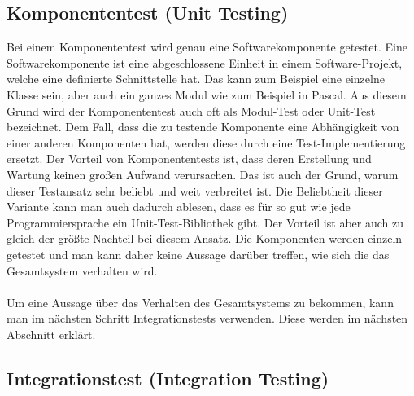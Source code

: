 \subsection{Komponententest (Unit Testing)}

Bei einem Komponententest wird genau eine Softwarekomponente getestet. Eine Softwarekomponente ist eine abgeschlossene Einheit in einem Software-Projekt, welche eine definierte Schnittstelle hat. Das kann zum Beispiel eine einzelne Klasse sein, aber auch ein ganzes Modul wie zum Beispiel in Pascal. Aus diesem Grund wird der Komponententest auch oft als Modul-Test oder Unit-Test bezeichnet. Dem Fall, dass die zu testende Komponente eine Abhängigkeit von einer anderen Komponenten hat, werden diese durch eine Test-Implementierung ersetzt. Der Vorteil von Komponententests ist, dass deren Erstellung und Wartung keinen großen Aufwand verursachen. Das ist auch der Grund, warum dieser Testansatz sehr beliebt und weit verbreitet ist. Die Beliebtheit dieser Variante kann man auch dadurch ablesen, dass es für so gut wie jede Programmiersprache ein Unit-Test-Bibliothek gibt. Der Vorteil ist aber auch zu gleich der größte Nachteil bei diesem Ansatz. Die Komponenten werden einzeln getestet und man kann daher keine Aussage darüber treffen, wie sich die das Gesamtsystem verhalten wird.\\
\\
Um eine Aussage über das Verhalten des Gesamtsystems zu bekommen, kann man im nächsten Schritt Integrationstests verwenden. Diese werden im nächsten Abschnitt erklärt.

\subsection{Integrationstest (Integration Testing)}

